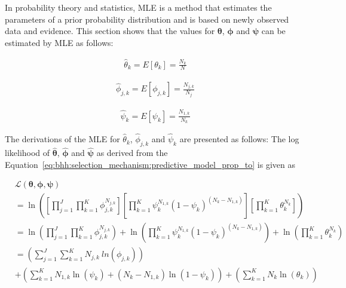 In probability theory and statistics, \acf{MLE} is a method that estimates the parameters of a prior probability distribution and is based on newly observed data and evidence. This section shows that the values for $\boldsymbol{\theta}$, $\boldsymbol{\phi}$ and $\boldsymbol{\psi}$ can be estimated by \acs{MLE} as follows:

\begin{equation}
      \label{eq:bhh:optimisation_step:mle:theta}
      \begin{split}
            \hat{\theta}_{k} = E[\theta_{k}] = \frac{N_{k}}{N}
      \end{split}
\end{equation}

\begin{equation}
      \label{eq:bhh:optimisation_step:mle:phi}
      \begin{split}
            \hat{\phi}_{j,k} = E[\phi_{j,k}] = \frac{N_{j,k}}{N_{j}}
      \end{split}
\end{equation}

\begin{equation}
      \label{eq:bhh:optimisation_step:mle:psi}
      \begin{split}
            \hat{\psi}_{k} = E[\psi_{k}] = \frac{N_{1,k}}{N_{k}}
      \end{split}
\end{equation}

The derivations of the \acs{MLE} for $\hat{\theta}_{k}$, $\hat{\phi}_{j,k}$ and
$\hat{\psi}_{k}$ are presented as follows: The log likelihood of $\boldsymbol{\hat{\theta}}$, $\boldsymbol{\hat{\phi}}$ and $\boldsymbol{\hat{\psi}}$ as derived from the Equation~\eqref{eq:bhh:selection_mechanism:predictive_model_prop_to} is given as

\begin{equation}
      \label{eq:bhh:optimisation_step:mle:log_likelihood_all}
      \begin{split}
            & \mathcal{L}(\boldsymbol{\theta}, \boldsymbol{\phi}, \boldsymbol{\psi}) \\
            &= \ln\left(\left[ \prod_{j=1}^{J} \prod_{k=1}^{K} \phi_{j,k}^{N_{j,k}} \right] \left[ \prod_{k=1}^{K} \psi_{k}^{N_{1,k}} (1 - \psi_{k})^{(N_{k} - N_{1,k})} \right] \left[ \prod_{k=1}^{K} \theta_{k}^{N_{k}} \right] \right) \\
            &= \ln \left( \prod_{j=1}^{J} \prod_{k=1}^{K} \phi_{j,k}^{N_{j,k}} \right) +  \ln \left( \prod_{k=1}^{K} \psi_{k}^{N_{1,k}} (1 - \psi_{k})^{(N_{k} - N_{1,k})} \right) + \ln \left( \prod_{k=1}^{K} \theta_{k}^{N_{k}} \right) \\
            &= \left( \sum_{j=1}^{J} \sum_{k=1}^{K} N_{j,k} \ ln \left( \phi_{j,k}
            \right) \right) \\
            &+ \left( \sum_{k=1}^{K} N_{1,k} \ln \left( \psi_{k} \right) + \left( N_{k} - N_{1,k} \right) \ln \left( 1 - \psi_{k} \right) \right) + \left( \sum_{k=1}^{K} N_{k} \ln \left( \theta_{k} \right) \right)
      \end{split}
\end{equation}

